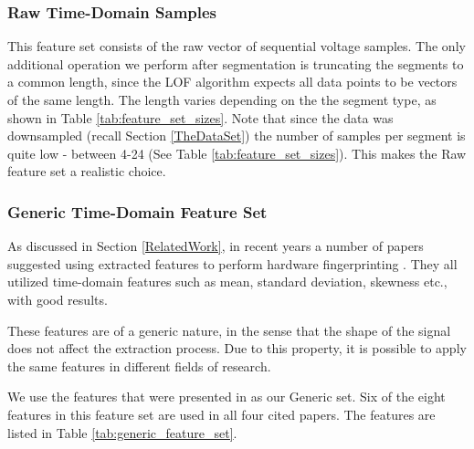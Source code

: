 \documentclass[conference]{IEEEtran}
\begin{document}
\subsubsection{Raw Time-Domain Samples}

  This feature set consists of the raw vector of sequential voltage samples. The only additional operation we perform after segmentation is truncating the segments to a common length, since the LOF algorithm expects all data points to be vectors of the same length. The length varies depending on the the segment type, as shown in Table \ref{tab:feature_set_sizes}. Note that since the data was downsampled (recall Section \ref{TheDataSet}) the number of samples per segment is quite low - between 4-24 (See Table \ref{tab:feature_set_sizes}). This makes the Raw feature set a realistic choice.
  
\subsubsection{Generic Time-Domain Feature Set}
  As discussed in Section \ref{RelatedWork}, in recent years a number of papers suggested using extracted features to perform hardware fingerprinting \cite{dey2014accelprint, choi2018identifying, choi2018voltageids, kneib2018scission}. They all utilized time-domain features such as mean, standard deviation, skewness etc., with good results.
  
  These features are of a generic nature, in the sense that the shape of the signal does not affect the extraction process. Due to this property, it is possible to apply the same features in different fields of research.
  
  We use the features that were presented in \cite{kneib2018scission} as our Generic set. Six of the eight features in this feature set are used in all four cited papers. The features are listed in Table \ref{tab:generic_feature_set}.
  
\end{document}
